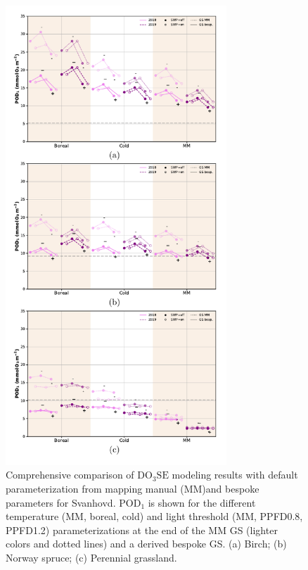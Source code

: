 \documentclass[bg, manuscript]{copernicus}
\begin{document}
\begin{figure}[t]
  \includegraphics[width=8.3cm]{fig14}
  \caption{Comprehensive comparison of $\mathrm{DO_3SE}$ modeling results with default parameterization from mapping manual (MM)and bespoke parameters for Svanhovd. $\mathrm{POD_1}$ is shown for the different temperature (MM, boreal, cold) and light threshold (MM, PPFD0.8, PPFD1.2) parameterizations at the end of the MM GS (lighter colors and dotted lines) and a derived bespoke GS. (a) Birch; (b) Norway spruce; (c) Perennial grassland.}
  \label{fig:pody_rel}
\end{figure}
\end{document}
